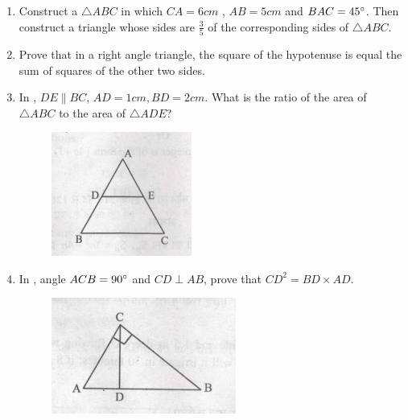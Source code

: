 \begin{enumerate}
\item Construct a $\triangle ABC$ in which $CA = 6cm$ , $AB = 5cm$ and $BAC= 45\degree$. Then  construct a triangle whose sides are $\frac{3}{5}$ of the corresponding sides of $\triangle ABC$.
\item Prove that in a right angle triangle, the square of the hypotenuse is equal the sum of squares of the other two sides.
\item In , $DE \parallel BC$, $ AD = 1 cm , BD = 2 cm$. What is the ratio of the area of $\triangle ABC$ to the area of $\triangle ADE$?
\begin{figure}[H]
			\centering
			\includegraphics[width=\columnwidth]{figs/tri123.jpg}
			\caption{}
			\label{fig:figure1}
			
			
		\end{figure} 
\item In , angle $ACB = 90\degree$ and $CD \perp AB$, prove that $CD ^ 2 = BD \times AD$.
\begin{figure}[H]                                                            \centering
                        \includegraphics[width=\columnwidth]{figs/i3.jpg}
			\caption{}
			\label{fig:figure3}
                \end{figure}
                

\end{enumerate}
